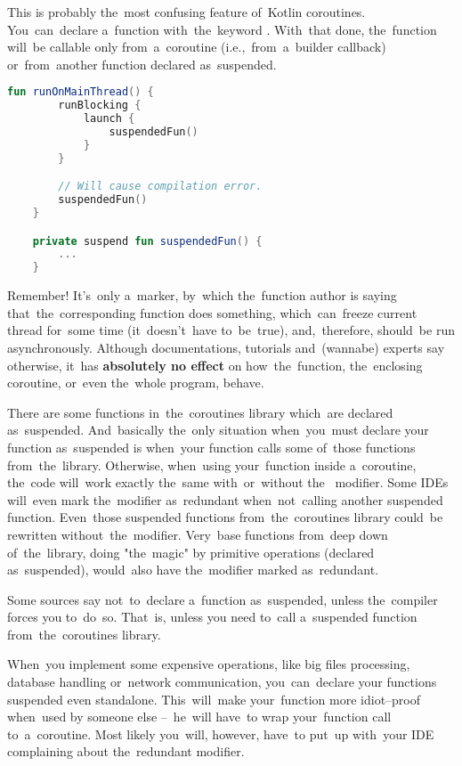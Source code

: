 \label{kotlinsuspendfunction}
This is probably the~most confusing feature of~Kotlin coroutines.
You~can~declare a~function with~the~keyword .
With~that done, the~function will~be callable only from~a~coroutine (i.e.,~from~a~builder callback) or~from~another function declared as~suspended.

\begin{lstlisting}[language=Kotlin]
    fun runOnMainThread() {
        runBlocking {
            launch {
                suspendedFun()
            }
        }

        // Will cause compilation error.
        suspendedFun()
    }

    private suspend fun suspendedFun() {
        ...
    }
\end{lstlisting}
\newline

\enlargethispage{5mm}
\noindent Remember!
It's~only a~marker, by~which the~function author is saying that~the~corresponding function does something, which~can~freeze current thread for~some time (it~doesn't~have to~be~true), and,~therefore, should~be run asynchronously.
Although documentations, tutorials and~(wannabe) experts say otherwise, it~has \textbf{absolutely no effect} on how~the~function, the~enclosing coroutine, or~even the~whole program, \mbox{behave.}

There are some functions in~the~coroutines library which~are declared as~suspended.
And~basically the~only situation when~you~must declare your function as~suspended is when~your function calls some of~those functions from~the~library.
Otherwise, when~using your~function inside a~coroutine, the~code will~work exactly the~same with~or~without the~ modifier.
Some \mbox{IDEs} will~even mark the~modifier as~redundant when~not~calling another suspended function.
Even~those suspended functions from~the~coroutines library could~be rewritten without~the~modifier.
Very~base functions from~deep down of~the~library, doing \mbox{"the magic"} by primitive operations (declared as~suspended), would~also have the~modifier marked \mbox{as redundant}.

Some sources say not~to~declare a~function as~suspended, unless the~compiler forces you to~do~so.
That~is, unless you need to~call a~suspended function from~the~coroutines \mbox{library.}

When~you implement some expensive operations, like big files processing, database handling or~network communication, you~can~declare your functions suspended even standalone.
This~will~make your~function more idiot--proof when~used by someone else --~he~will have~to wrap your~function call to~a~coroutine.
Most likely you~will, however, have~to put~up with~your IDE complaining about the~redundant \mbox{modifier.}
\newpage

